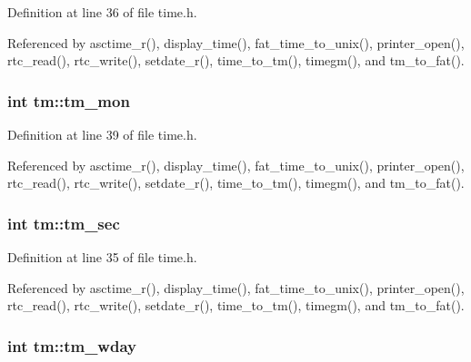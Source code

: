Definition at line 36 of file time.\-h.



Referenced by asctime\-\_\-r(), display\-\_\-time(), fat\-\_\-time\-\_\-to\-\_\-unix(), printer\-\_\-open(), rtc\-\_\-read(), rtc\-\_\-write(), setdate\-\_\-r(), time\-\_\-to\-\_\-tm(), timegm(), and tm\-\_\-to\-\_\-fat().

\hypertarget{structtm_a112ac36fa2f593777138a417cf031e17}{
\subsubsection[{tm\-\_\-mon}]{\setlength{\rightskip}{0pt plus 5cm}int tm\-::tm\-\_\-mon}}\label{structtm_a112ac36fa2f593777138a417cf031e17}


Definition at line 39 of file time.\-h.



Referenced by asctime\-\_\-r(), display\-\_\-time(), fat\-\_\-time\-\_\-to\-\_\-unix(), printer\-\_\-open(), rtc\-\_\-read(), rtc\-\_\-write(), setdate\-\_\-r(), time\-\_\-to\-\_\-tm(), timegm(), and tm\-\_\-to\-\_\-fat().

\hypertarget{structtm_a4d098a9a5c03a00b2ee61e10851de81e}{
\subsubsection[{tm\-\_\-sec}]{\setlength{\rightskip}{0pt plus 5cm}int tm\-::tm\-\_\-sec}}\label{structtm_a4d098a9a5c03a00b2ee61e10851de81e}


Definition at line 35 of file time.\-h.



Referenced by asctime\-\_\-r(), display\-\_\-time(), fat\-\_\-time\-\_\-to\-\_\-unix(), printer\-\_\-open(), rtc\-\_\-read(), rtc\-\_\-write(), setdate\-\_\-r(), time\-\_\-to\-\_\-tm(), timegm(), and tm\-\_\-to\-\_\-fat().

\hypertarget{structtm_afe81a8c46f1c693c43f259b288859f4f}{
\subsubsection[{tm\-\_\-wday}]{\setlength{\rightskip}{0pt plus 5cm}int tm\-::tm\-\_\-wday}}\label{structtm_afe81a8c46f1c693c43f259b288859f4f}


